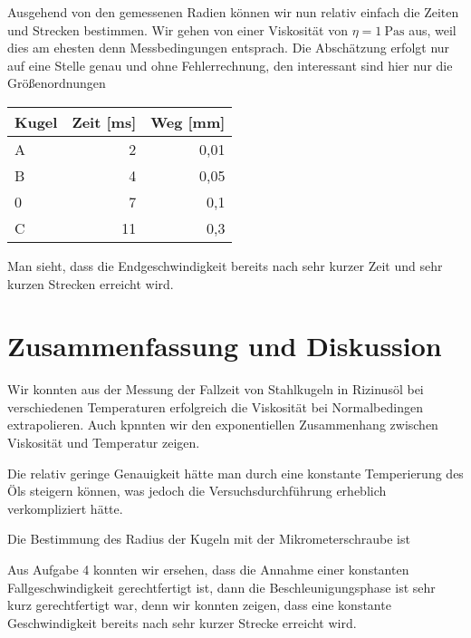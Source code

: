 \documentclass[a4paper,german,12pt,smallheadings]{scrartcl}
\begin{document}
Ausgehend von den gemessenen Radien können wir nun relativ einfach die Zeiten
und Strecken bestimmen. Wir gehen von einer Viskosität von $\eta =
\SI{1}{\pascal \second}$ aus, weil dies am ehesten denn Messbedingungen
entsprach. Die Abschätzung erfolgt nur auf eine Stelle genau und ohne
Fehlerrechnung, den interessant sind hier nur die Größenordnungen

\vspace{0.5 cm}
\begin{tabular}{l|r|r}
  Kugel & Zeit [ms] & Weg [mm] \\
  \hline
  A & 2 & 0{,}01 \\
  B & 4 & 0{,}05 \\
  0 & 7 & 0{,}1 \\
  C & 11 & 0{,}3
\end{tabular}
\vspace{0.5 cm}

Man sieht, dass die Endgeschwindigkeit bereits nach sehr kurzer Zeit und sehr
kurzen Strecken erreicht wird.

\section*{Zusammenfassung und Diskussion}

Wir konnten aus der Messung der Fallzeit von Stahlkugeln in Rizinusöl bei
verschiedenen Temperaturen erfolgreich die Viskosität bei Normalbedingen
extrapolieren. Auch kpnnten wir den exponentiellen Zusammenhang zwischen
Viskosität und Temperatur zeigen.

Die relativ geringe Genauigkeit hätte man durch eine konstante Temperierung des
Öls steigern können, was jedoch die Versuchsdurchführung erheblich
verkompliziert hätte.

Die Bestimmung des Radius der Kugeln mit der Mikrometerschraube ist

Aus Aufgabe 4 konnten wir ersehen, dass die Annahme einer konstanten
Fallgeschwindigkeit gerechtfertigt ist, dann die Beschleunigungsphase ist sehr
kurz gerechtfertigt war, denn wir konnten zeigen, dass eine konstante
Geschwindigkeit bereits nach sehr kurzer Strecke erreicht wird.

\begin{landscape}
  
\end{landscape}
\end{document}
